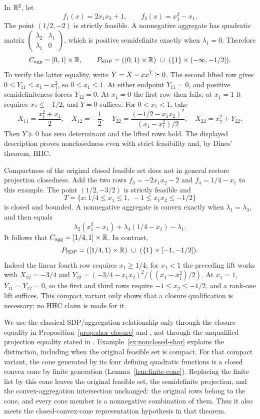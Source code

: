 \begin{example}
\label{ex:nonclosed-shor}
In $\mathbb R^2$, let
\[
 f_1(x)=2x_1x_2+1,\qquad f_2(x)=x_1^2-x_1.
\]
The point $(1/2,-2)$ is strictly feasible. A nonnegative aggregate has
quadratic matrix
$\left(\begin{smallmatrix}\lambda_2&\lambda_1\\
\lambda_1&0\end{smallmatrix}\right)$, which is positive semidefinite
exactly when $\lambda_1=0$. Therefore
\[
 C_{\rm agg}=[0,1]\times\mathbb R,
 \qquad
 P_{\rm SDP}=((0,1)\times\mathbb R)\ \cup\ (\{1\}\times(-\infty,-1/2]).
\]
To verify the latter equality, write $Y=X-xx^{\mathsf T}\succeq0$.
The second lifted row gives $0\leq Y_{11}\leq x_1-x_1^2$, so
$0\leq x_1\leq1$. At either endpoint $Y_{11}=0$, and positive
semidefiniteness forces $Y_{12}=0$. At $x_1=0$ the first row then
fails; at $x_1=1$ it requires $x_2\leq-1/2$, and $Y=0$ suffices.
For $0<x_1<1$, take
\[
 X_{11}=\frac{x_1^2+x_1}{2},\quad X_{12}=-\frac12,
 \quad
 Y_{22}=\frac{(-1/2-x_1x_2)^2}{(x_1-x_1^2)/2},
 \quad X_{22}=x_2^2+Y_{22}.
\]
Then $Y\succeq0$ has zero determinant and the lifted rows hold.
The displayed description proves nonclosedness even with strict
feasibility and, by Dines' theorem, HHC.

Compactness of the original closed feasible set does not in general
restore projection closedness. Add the two rows
$f_3=-2x_1x_2-2$ and $f_4=1/4-x_1$ to this example.
The point $(1/2,-3/2)$ is strictly feasible and
\[
 T=\{x:1/4\leq x_1\leq1,\ -1\leq x_1x_2\leq-1/2\}
\]
is closed and bounded. A nonnegative aggregate is convex exactly
when $\lambda_1=\lambda_3$, and then equals
\[
 \lambda_2(x_1^2-x_1)+\lambda_4(1/4-x_1)-\lambda_1.
\]
It follows that $C_{\rm agg}=[1/4,1]\times\mathbb R$. In contrast,
\[
 P_{\rm SDP}=([1/4,1)\times\R)\ \cup\ (\{1\}\times[-1,-1/2]).
\]
Indeed the linear fourth row requires $x_1\geq1/4$;
for $x_1<1$ the preceding lift works with $X_{12}=-3/4$ and
$Y_{22}=(-3/4-x_1x_2)^2/((x_1-x_1^2)/2)$.
At $x_1=1$, $Y_{11}=Y_{12}=0$, so the first and third rows require
$-1\leq x_2\leq-1/2$, and a rank-one lift suffices.
This compact variant only shows that a closure qualification is
necessary; no HHC claim is made for it.
\end{example}

We use the classical SDP/aggregation relationship only through the
closure equality in Proposition~\ref{prop:shor-closure} and
\citet[Theorem~2.1]{FujieKojima1997}, not through the unqualified
projection equality stated in \citet[Theorem~4.2]{KojimaTuncel2000}.
Example~\ref{ex:nonclosed-shor} explains the distinction, including
when the original feasible set is compact. For that compact variant, the cone generated by its four defining
quadratic functions is a closed convex cone by finite generation
(Lemma~\ref{lem:finite-cone}). Replacing the finite list by this cone
leaves the original feasible set, the semidefinite projection, and the
convex-aggregation intersection unchanged: the original rows belong to
the cone, and every cone member is a nonnegative combination of them.
Thus it also meets the closed-convex-cone representation hypothesis in
that theorem.
